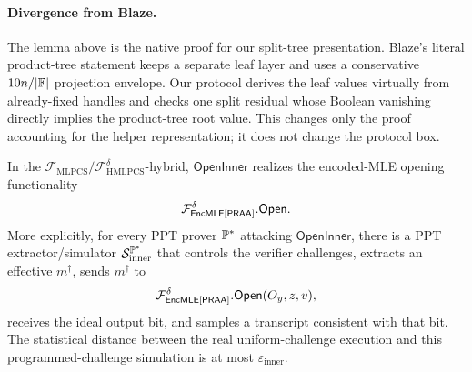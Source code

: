 \paragraph{Divergence from Blaze.}
The lemma above is the native proof for our split-tree presentation.  Blaze's
literal product-tree statement keeps a separate leaf layer and uses a
conservative \(10n/|\mathbb{F}|\) projection envelope.  Our protocol derives the leaf
values virtually from already-fixed handles and checks one split residual whose
Boolean vanishing directly implies the product-tree root value.  This changes
only the proof accounting for the helper representation; it does not change the
protocol box.

\begin{lemma}
\label{lem:native-openinner-target}
In the
\(\mathcal F_{\mathrm{MLPCS}}/\mathcal F_{\mathrm{HMLPCS}}^\delta\)-hybrid,
\(\mathsf{OpenInner}\) realizes the encoded-MLE opening functionality
\[
  \mathcal F_{\mathsf{EncMLE}[\mathsf{PRAA}]}^\delta.\mathsf{Open}.
\]
More explicitly, for every PPT prover \(\mathbb{P}^\ast\) attacking
\(\mathsf{OpenInner}\), there is a PPT extractor/simulator
\(\mathcal S_{\mathrm{inner}}^{\mathbb{P}^\ast}\) that controls the verifier
challenges, extracts an effective \(m^\dagger\), sends \(m^\dagger\) to
\[
  \mathcal F_{\mathsf{EncMLE}[\mathsf{PRAA}]}^\delta.\mathsf{Open}(O_y,z,v),
\]
receives the ideal output bit, and samples a transcript consistent with that
bit.  The
statistical distance between the real uniform-challenge execution and this
programmed-challenge simulation is at most
\(\varepsilon_{\mathrm{inner}}\).
\end{lemma}

